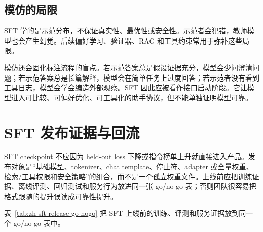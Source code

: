 \documentclass[UTF8,zihao=-4,openany]{ctexbook}
\begin{document}
\subsection{模仿的局限}
SFT 学的是示范分布，不保证真实性、最优性或安全性。示范者会犯错，教师模型也会产生幻觉。后续偏好学习、验证器、RAG 和工具约束常用于弥补这些局限。

模仿还会固化标注流程的盲点。若示范答案总是假设证据充分，模型会少问澄清问题；若示范答案总是长篇解释，模型会在简单任务上过度回答；若示范者没有看到工具日志，模型会学会编造外部观察。SFT 因此应被看作接口启动阶段。它让模型进入可比较、可偏好优化、可工具化的助手协议，但不能单独证明模型可靠。

\section{SFT 发布证据与回流}
SFT checkpoint 不应因为 held-out loss 下降或指令榜单上升就直接进入产品。发布对象是“基础模型、tokenizer、chat template、停止符、adapter 或全量权重、检索/工具权限和安全策略”的组合，而不是一个孤立权重文件。上线前应把训练证据、离线评测、回归测试和服务行为放进同一张 go/no-go 表；否则团队很容易把格式跟随的提升误读成可靠性提升。

表~\ref{tab:zh-sft-release-go-nogo} 把 SFT 上线前的训练、评测和服务证据放到同一个 go/no-go 表中。
\end{document}
